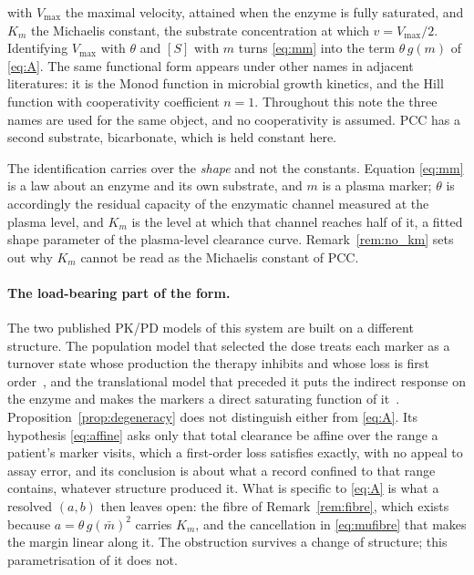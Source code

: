 with $V_{\max}$ the maximal velocity, attained when the enzyme is fully saturated, and
$K_m$ the Michaelis constant, the substrate concentration at which $v = V_{\max}/2$.
Identifying $V_{\max}$ with $\theta$ and $[S]$ with $m$ turns \eqref{eq:mm} into the term
$\theta\, g(m)$ of \eqref{eq:A}. The same functional form appears under other names in
adjacent literatures: it is the Monod function in microbial growth kinetics, and the Hill
function with cooperativity coefficient $n = 1$. Throughout this note the three names are
used for the same object, and no cooperativity is assumed. PCC has a second substrate,
bicarbonate, which is held constant here.

The identification carries over the \emph{shape} and not the constants. Equation
\eqref{eq:mm} is a law about an enzyme and its own substrate, and $m$ is a plasma marker;
$\theta$ is accordingly the residual capacity of the enzymatic channel measured at the
plasma level, and $K_m$ is the level at which that channel reaches half of it, a fitted
shape parameter of the plasma-level clearance curve. Remark~\ref{rem:no_km} sets out why
$K_m$ cannot be read as the Michaelis constant of PCC.

\paragraph{The load-bearing part of the form.}
\label{sec:structure}
The two published PK/PD models of this system are built on a different structure. The
population model that selected the dose treats each marker as a turnover state whose
production the therapy inhibits and whose loss is first
order~\cite{dose_selection_poster}, and the translational model that preceded it puts the
indirect response on the enzyme and makes the markers a direct saturating function of
it~\cite{pkpd_translational}. %
Proposition~\ref{prop:degeneracy} does not distinguish either from \eqref{eq:A}. Its
hypothesis \eqref{eq:affine} asks only that total clearance be affine over the range a
patient's marker visits, which a first-order loss satisfies exactly, with no appeal to
assay error, and its conclusion is about what a record confined to that range contains,
whatever structure produced it. What is specific to \eqref{eq:A} is what a
resolved $(a,b)$ then leaves open: the fibre of Remark~\ref{rem:fibre}, which exists because
$a = \theta\, g(\bar m)^2$ carries $K_m$, and the cancellation in \eqref{eq:mufibre} that
makes the margin linear along it. The obstruction survives a change of structure; this
parametrisation of it does not.

